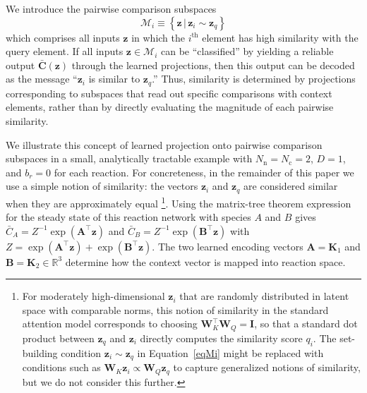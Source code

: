\documentclass[%
reprint,
superscriptaddress,
amsmath,amssymb,
aps,
]{revtex4-2}
\newcommand{\bz}{\mathbf{z}}       %
\begin{document}
	We introduce the pairwise comparison subspaces
	\begin{equation}
		\mathcal{M}_i \equiv \left\{\mathbf{z} \,\big|\, \mathbf{z}_i \sim \mathbf{z}_{q}\right\} \label{eqMi}
	\end{equation}
	which comprises all inputs $\mathbf{z}$ in which the $i^\text{th}$ element has high similarity with the query element. If all inputs $\mathbf{z} \in \mathcal{M}_i$ can be ``classified'' by yielding a reliable output $\bar{\mathbf{C}}(\bz)$ through the learned projections, then this output can be decoded as the message ``$\mathbf{z}_i$ is similar to $\mathbf{z}_{q}$.''  Thus, similarity is determined by projections corresponding to subspaces that read out specific comparisons with context elements, rather than by directly evaluating the magnitude of each pairwise similarity.    
	
	We illustrate this concept of learned projection onto pairwise comparison subspaces in a small, analytically tractable example with $N_\text{n} = N_\text{c} = 2$, $D = 1$, and $b_r = 0$ for each reaction.  For concreteness, in the remainder of this paper we use a simple notion of similarity: the vectors $\mathbf{z}_i$ and $\mathbf{z}_{q}$ are considered similar when they are approximately equal
	\footnote{For moderately high-dimensional $\mathbf{z}_i$ that are randomly distributed in latent space with comparable norms, this notion of similarity in the standard attention model corresponds to choosing $\mathbf{W}_K^\intercal \mathbf{W}_Q = \mathbf{I}$, so that a standard dot product between $\mathbf{z}_{q}$ and $\mathbf{z}_i$ directly computes the similarity score $q_i$. The set-building condition $\mathbf{z}_i \sim \mathbf{z}_{q}$ in Equation~\ref{eqMi} might be replaced with conditions such as $\mathbf{W}_K \mathbf{z}_i \propto \mathbf{W}_Q \mathbf{z}_{q}$ to capture generalized notions of similarity, but we do not consider this further.}.  
	Using the matrix-tree theorem expression \cite{schnakenberg1976network} for the steady state of this reaction network with species $A$ and $B$ gives $\bar{C}_A = Z^{-1} \exp\left(\mathbf{A}^\intercal \mathbf{z}\right)$ and $\bar{C}_B = Z^{-1} \exp\left(\mathbf{B}^\intercal \mathbf{z}\right)$ with $Z = \exp\left(\mathbf{A}^\intercal \mathbf{z}\right) + \exp\left(\mathbf{B}^\intercal\mathbf{z}\right)$.  The two learned encoding vectors $\mathbf{A} = \mathbf{K}_1$ and $\mathbf{B} = \mathbf{K}_2 \in \mathbb{R}^{3}$ determine how the context vector is mapped into reaction space.
	
\end{document}
